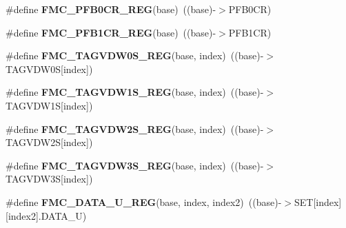 \begin{DoxyCompactItemize}
\item 
\#define {\bfseries F\+M\+C\+\_\+\+P\+F\+B0\+C\+R\+\_\+\+R\+EG}(base)~((base)-\/$>$P\+F\+B0\+CR)\hypertarget{group__FMC__Register__Accessor__Macros_ga649247bd1f9692d5676abc8295aa760f}{}\label{group__FMC__Register__Accessor__Macros_ga649247bd1f9692d5676abc8295aa760f}

\item 
\#define {\bfseries F\+M\+C\+\_\+\+P\+F\+B1\+C\+R\+\_\+\+R\+EG}(base)~((base)-\/$>$P\+F\+B1\+CR)\hypertarget{group__FMC__Register__Accessor__Macros_gab2e6001f0fe90cc1e40413b4de0998f7}{}\label{group__FMC__Register__Accessor__Macros_gab2e6001f0fe90cc1e40413b4de0998f7}

\item 
\#define {\bfseries F\+M\+C\+\_\+\+T\+A\+G\+V\+D\+W0\+S\+\_\+\+R\+EG}(base,  index)~((base)-\/$>$T\+A\+G\+V\+D\+W0S\mbox{[}index\mbox{]})\hypertarget{group__FMC__Register__Accessor__Macros_ga3282a41aef2d6dda9997b0b3c273bb5e}{}\label{group__FMC__Register__Accessor__Macros_ga3282a41aef2d6dda9997b0b3c273bb5e}

\item 
\#define {\bfseries F\+M\+C\+\_\+\+T\+A\+G\+V\+D\+W1\+S\+\_\+\+R\+EG}(base,  index)~((base)-\/$>$T\+A\+G\+V\+D\+W1S\mbox{[}index\mbox{]})\hypertarget{group__FMC__Register__Accessor__Macros_ga46414611eff014d9addd13d6f03bcb20}{}\label{group__FMC__Register__Accessor__Macros_ga46414611eff014d9addd13d6f03bcb20}

\item 
\#define {\bfseries F\+M\+C\+\_\+\+T\+A\+G\+V\+D\+W2\+S\+\_\+\+R\+EG}(base,  index)~((base)-\/$>$T\+A\+G\+V\+D\+W2S\mbox{[}index\mbox{]})\hypertarget{group__FMC__Register__Accessor__Macros_gad38efd11667432ffac106977963f4317}{}\label{group__FMC__Register__Accessor__Macros_gad38efd11667432ffac106977963f4317}

\item 
\#define {\bfseries F\+M\+C\+\_\+\+T\+A\+G\+V\+D\+W3\+S\+\_\+\+R\+EG}(base,  index)~((base)-\/$>$T\+A\+G\+V\+D\+W3S\mbox{[}index\mbox{]})\hypertarget{group__FMC__Register__Accessor__Macros_ga55ed90931822defa680632f67db0ca6b}{}\label{group__FMC__Register__Accessor__Macros_ga55ed90931822defa680632f67db0ca6b}

\item 
\#define {\bfseries F\+M\+C\+\_\+\+D\+A\+T\+A\+\_\+\+U\+\_\+\+R\+EG}(base,  index,  index2)~((base)-\/$>$S\+ET\mbox{[}index\mbox{]}\mbox{[}index2\mbox{]}.D\+A\+T\+A\+\_\+U)\hypertarget{group__FMC__Register__Accessor__Macros_ga3815d67d783bd291e01211ac4c0f4a52}{}\label{group__FMC__Register__Accessor__Macros_ga3815d67d783bd291e01211ac4c0f4a52}


\end{DoxyCompactItemize}
